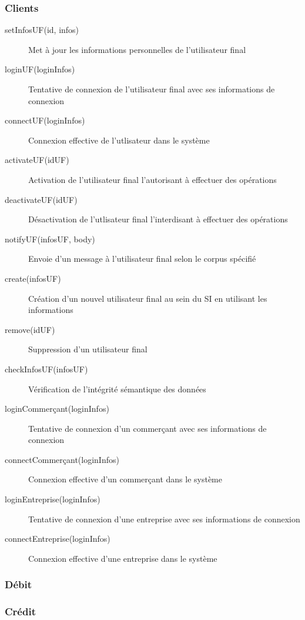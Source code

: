 \subsubsection{Clients}
\begin{description}
  \item[setInfosUF(id, infos)] Met à jour les informations personnelles de l'utilisateur final
  \item[loginUF(loginInfos)] Tentative de connexion de l'utilisateur final avec ses informations de connexion
  \item[connectUF(loginInfos)] Connexion effective de l'utlisateur dans le système
  \item[activateUF(idUF)] Activation de l'utilisateur final l'autorisant à effectuer des opérations
  \item[deactivateUF(idUF)] Désactivation de l'utlisateur final l'interdisant à effectuer des opérations
  \item[notifyUF(infosUF, body)] Envoie d'un message à l'utilisateur final selon le corpus spécifié
  \item[create(infosUF)] Création d'un nouvel utilisateur final au sein du SI en utilisant les informations
  \item[remove(idUF)] Suppression d'un utilisateur final
  \item[checkInfosUF(infosUF)] Vérification de l'intégrité sémantique des données
  \item[loginCommerçant(loginInfos)] Tentative de connexion d'un commerçant avec ses informations de connexion
  \item[connectCommerçant(loginInfos)] Connexion effective d'un commerçant dans le système
  \item[loginEntreprise(loginInfos)] Tentative de connexion d'une entreprise avec ses informations de connexion
  \item[connectEntreprise(loginInfos)] Connexion effective d'une entreprise dans le système
\end{description}

\subsubsection{Débit}

\subsubsection{Crédit}

